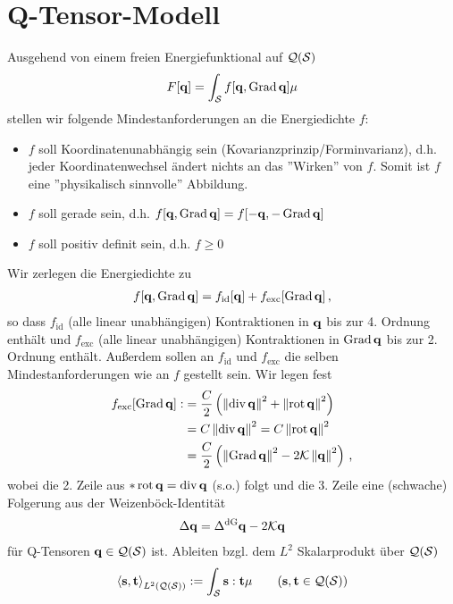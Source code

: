 \documentclass[a4paper,11pt]{scrartcl}
\newcommand{\qspace}{\mathcal{Q}(\surf)}
\newcommand{\ldG}{\Delta^{\text{dG}}}
\newcommand{\fid}{f_{\text{id}}}
\newcommand{\fexc}{f_{\text{exc}}}
\begin{document}
\section{Q-Tensor-Modell}
Ausgehend von einem freien Energiefunktional auf \( \qspace \)
\begin{align}
  F[\mathbf{q}] = \int_{\mathcal{S}}f[\mathbf{q},\operatorname{Grad}\mathbf{q}]\mu
\end{align}
stellen wir folgende Mindestanforderungen an die Energiedichte \( f \):
\begin{itemize}
  \item \( f \) soll Koordinatenunabhängig sein (Kovarianzprinzip/Forminvarianz), 
      d.h. jeder Koordinatenwechsel ändert nichts an das ''Wirken'' von \( f \).
      Somit ist \( f \) eine ''physikalisch sinnvolle'' Abbildung.
  \item \( f \) soll gerade sein, d.h. \( f[\mathbf{q},\operatorname{Grad}\mathbf{q}] = f[-\mathbf{q},-\operatorname{Grad}\mathbf{q}] \)
  \item \( f \) soll positiv definit sein, d.h. \( f\ge 0 \)
\end{itemize}
Wir zerlegen die Energiedichte zu
\begin{align}
  f[\qb,\Grad\qb] = \fid[\qb] + \fexc[\Grad\qb]\formComma
\end{align}
so dass \( \fid\) (alle linear unabhängigen) Kontraktionen in \( \mathbf{q} \) bis zur 4. Ordnung enthält und
\( \fexc \) (alle linear unabhängigen) Kontraktionen in \( \operatorname{Grad}\mathbf{q} \) bis zur 2. Ordnung enthält.
Außerdem sollen an \( \fid \) und \( \fexc \) die selben Mindestanforderungen wie an \( f \) gestellt sein.
Wir legen fest
\begin{align}
  \fexc[\Grad\qb] :&=  \frac{C}{2}\left( \left\| \div\qb \right\|^{2} + \left\| \rot\qb \right\|^{2} \right) \\
                  &=C\left\| \div\qb \right\|^{2} = C\left\| \rot\qb \right\|^{2} \\
                  &= \frac{C}{2}\left( \left\| \Grad\qb \right\|^{2} - 2\mathcal{K}\left\| \qb \right\|^{2} \right) \formComma
\end{align}
wobei die 2. Zeile aus \( *\operatorname{rot}\mathbf{q} = \operatorname{div}\mathbf{q} \) (s.o.) folgt
und die 3. Zeile eine (schwache) Folgerung aus der Weizenböck-Identität
\begin{align}
  \Delta\qb = \ldG\qb - 2\mathcal{K}\qb
\end{align}
für Q-Tensoren \( \qb\in\qspace \) ist. 
Ableiten bzgl. dem \( L^{2} \) Skalarprodukt über \( \qspace \)
\begin{align}
  \left\langle \sb , \tb \right\rangle_{L^{2}(\qspace)} := \int_{\surf} \sb : \tb \mu 
    \qquad (\sb,\tb\in\qspace)
\end{align}
\end{document}
